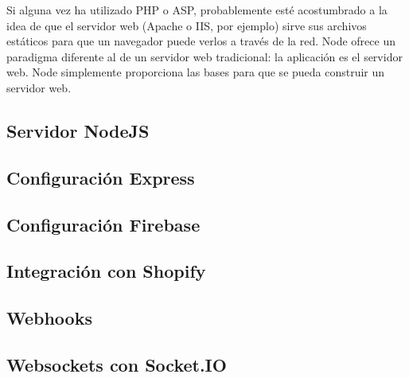 Si alguna vez ha utilizado PHP o ASP, probablemente esté acostumbrado a la idea de que el servidor web (Apache o IIS, por ejemplo) sirve sus archivos estáticos para que un navegador puede verlos a través de la red. Node ofrece un paradigma diferente al de un servidor web tradicional: la aplicación es el servidor web. Node simplemente proporciona las bases para que se pueda construir un servidor web. 

\subsection{Servidor NodeJS}


\subsection{Configuración Express}


\subsection{Configuración Firebase}


\subsection{Integración con Shopify}


\subsection{Webhooks}


\subsection{Websockets con Socket.IO}

